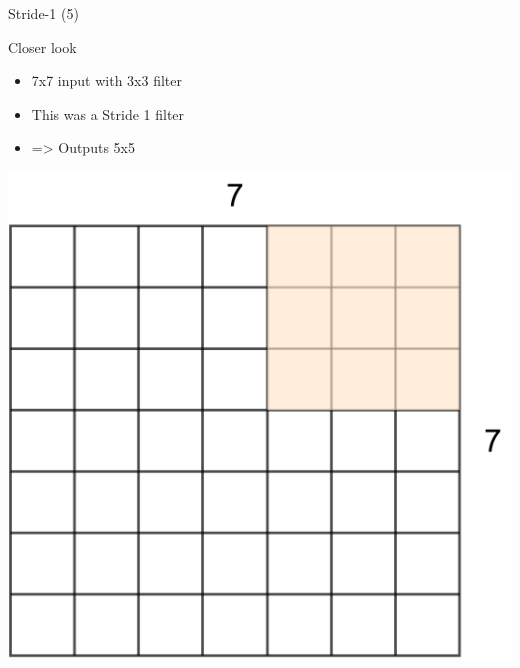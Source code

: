 \documentclass[default, aspectratio=169]{beamer}
\begin{document}
	\begin{frame}{Stride-1 (5)}
		\vspace{0.5cm}
		
		\normalsize Closer look
		\begin{itemize}
			\item 7x7 input with 3x3 filter
			\item This was a Stride 1 filter
			\item=> Outputs 5x5
		\end{itemize}
		
		\centering
		\includegraphics[keepaspectratio, scale=0.25]{pic/Stride5.png}
	\end{frame}
	
\end{document}
